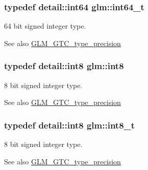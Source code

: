 \subsubsection[{int64\+\_\+t}]{\setlength{\rightskip}{0pt plus 5cm}typedef detail\+::int64 {\bf glm\+::int64\+\_\+t}}\label{group__gtc__type__precision_ga6abb23fbf4e39c50ec5341160b5da5ab}
64 bit signed integer type. \begin{DoxySeeAlso}{See also}
\hyperlink{group__gtc__type__precision}{G\+L\+M\+\_\+\+G\+T\+C\+\_\+type\+\_\+precision} 
\end{DoxySeeAlso}
\hypertarget{group__gtc__type__precision_ga96254f9c1c4506fc8eb5cf3301ce8565}{}
\subsubsection[{int8}]{\setlength{\rightskip}{0pt plus 5cm}typedef detail\+::int8 {\bf glm\+::int8}}\label{group__gtc__type__precision_ga96254f9c1c4506fc8eb5cf3301ce8565}
8 bit signed integer type. \begin{DoxySeeAlso}{See also}
\hyperlink{group__gtc__type__precision}{G\+L\+M\+\_\+\+G\+T\+C\+\_\+type\+\_\+precision} 
\end{DoxySeeAlso}
\hypertarget{group__gtc__type__precision_ga673898d450b2a91186f3c4f40c5f8633}{}
\subsubsection[{int8\+\_\+t}]{\setlength{\rightskip}{0pt plus 5cm}typedef detail\+::int8 {\bf glm\+::int8\+\_\+t}}\label{group__gtc__type__precision_ga673898d450b2a91186f3c4f40c5f8633}
8 bit signed integer type. \begin{DoxySeeAlso}{See also}
\hyperlink{group__gtc__type__precision}{G\+L\+M\+\_\+\+G\+T\+C\+\_\+type\+\_\+precision} 
\end{DoxySeeAlso}
\hypertarget{group__gtc__type__precision_gae7a1571503f83d2264ddfa705a6b082a}{}
